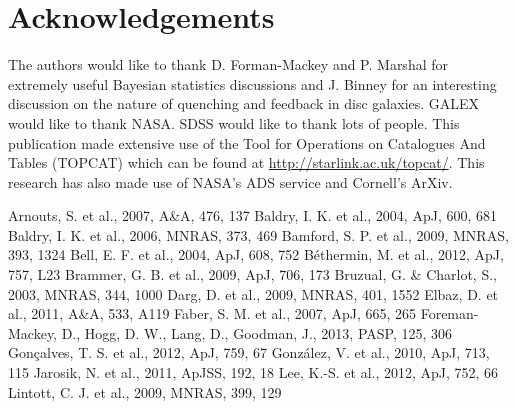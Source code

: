 \documentclass{mn2e}
\begin{document}
\section*{Acknowledgements}
The authors would like to thank D. Forman-Mackey and P. Marshal for extremely useful Bayesian statistics discussions and J. Binney for an interesting discussion on the nature of quenching and feedback in disc galaxies. GALEX would like to thank NASA. SDSS would like to thank lots of people. This publication made extensive use of the Tool for Operations on Catalogues And Tables (TOPCAT) which can be found at \url{http://starlink.ac.uk/topcat/}. This research has also made use of NASA's ADS service and Cornell's ArXiv. 

\begin{thebibliography}{}
 Arnouts, S. et al., 2007, A\&A, 476, 137
 Baldry, I. K. et al., 2004, ApJ, 600, 681
 Baldry, I. K. et al., 2006, MNRAS, 373, 469
 Bamford, S. P. et al., 2009, MNRAS, 393, 1324
 Bell, E. F. et al., 2004, ApJ, 608, 752
 B\'ethermin, M. et al., 2012, ApJ, 757, L23
 Brammer, G. B. et al., 2009, ApJ, 706, 173
 Bruzual, G. \& Charlot, S., 2003, MNRAS, 344, 1000
 Darg, D. et al., 2009, MNRAS, 401, 1552
 Elbaz, D. et al., 2011, A\&A, 533, A119
 Faber, S. M. et al., 2007, ApJ, 665, 265
 Foreman-Mackey, D., Hogg, D. W., Lang, D., Goodman, J., 2013, PASP, 125, 306
 Gon\c calves, T. S. et al., 2012, ApJ, 759, 67
 Gonz\'alez, V. et al., 2010, ApJ, 713, 115
 Jarosik, N. et al., 2011, ApJSS, 192, 18
 Lee, K.-S. et al., 2012, ApJ, 752, 66
 Lintott, C. J. et al., 2009, MNRAS, 399, 129

\end{thebibliography}
\end{document}
